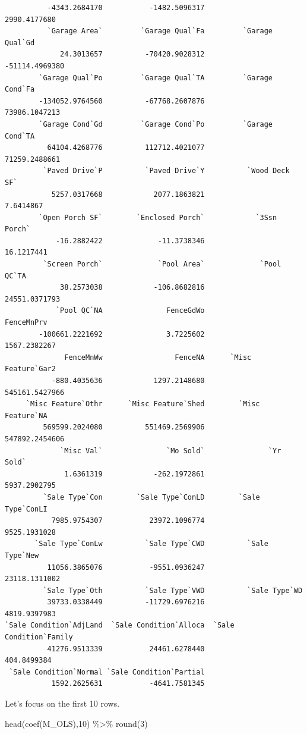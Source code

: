 \documentclass[
  letterpaper,
  DIV=11,
  numbers=noendperiod]{scrreprt}
\newenvironment{Shaded}{\begin{snugshade}}{\end{snugshade}}
\newcommand{\DecValTok}[1]{\textcolor[rgb]{0.68,0.00,0.00}{#1}}
\newcommand{\FunctionTok}[1]{\textcolor[rgb]{0.28,0.35,0.67}{#1}}
\newcommand{\NormalTok}[1]{\textcolor[rgb]{0.00,0.23,0.31}{#1}}
\newcommand{\SpecialCharTok}[1]{\textcolor[rgb]{0.37,0.37,0.37}{#1}}
\begin{document}
\begin{verbatim}
          -4343.2684170           -1482.5096317            2990.4177680 
          `Garage Area`         `Garage Qual`Fa         `Garage Qual`Gd 
             24.3013657          -70420.9028312          -51114.4969380 
        `Garage Qual`Po         `Garage Qual`TA         `Garage Cond`Fa 
        -134052.9764560          -67768.2607876           73986.1047213 
        `Garage Cond`Gd         `Garage Cond`Po         `Garage Cond`TA 
          64104.4268776          112712.4021077           71259.2488661 
         `Paved Drive`P          `Paved Drive`Y          `Wood Deck SF` 
           5257.0317668            2077.1863821               7.6414867 
        `Open Porch SF`        `Enclosed Porch`            `3Ssn Porch` 
            -16.2882422             -11.3738346              16.1217441 
         `Screen Porch`             `Pool Area`             `Pool QC`TA 
             38.2573038            -106.8682816           24551.0371793 
            `Pool QC`NA               FenceGdWo              FenceMnPrv 
        -100661.2221692               3.7225602            1567.2382267 
              FenceMnWw                 FenceNA      `Misc Feature`Gar2 
           -880.4035636            1297.2148680          545161.5427966 
     `Misc Feature`Othr      `Misc Feature`Shed        `Misc Feature`NA 
         569599.2024080          551469.2569906          547892.2454606 
             `Misc Val`               `Mo Sold`               `Yr Sold` 
              1.6361319            -262.1972861            5937.2902795 
         `Sale Type`Con        `Sale Type`ConLD        `Sale Type`ConLI 
           7985.9754307           23972.1096774            9525.1931028 
       `Sale Type`ConLw          `Sale Type`CWD          `Sale Type`New 
          11056.3865076           -9551.0936247           23118.1311002 
         `Sale Type`Oth          `Sale Type`VWD          `Sale Type`WD  
          39733.0338449          -11729.6976216            4819.9397983 
`Sale Condition`AdjLand  `Sale Condition`Alloca  `Sale Condition`Family 
          41276.9513339           24461.6278440             404.8499384 
 `Sale Condition`Normal `Sale Condition`Partial 
           1592.2625631           -4641.7581345 
\end{verbatim}

Let's focus on the first 10 rows.

\begin{Shaded}
\begin{Highlighting}[]
\FunctionTok{head}\NormalTok{(}\FunctionTok{coef}\NormalTok{(M\_OLS),}\DecValTok{10}\NormalTok{) }\SpecialCharTok{\%\textgreater{}\%} \FunctionTok{round}\NormalTok{(}\DecValTok{3}\NormalTok{)}
\end{Highlighting}
\end{Shaded}
\end{document}
